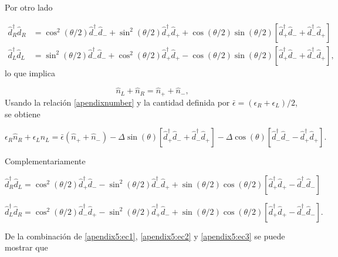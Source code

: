 \begin{appendixs}
Por otro lado

\begin{align*}
    \hat{d}^{\dagger}_{R}\hat{d}_{R} & = \cos^{2}(\theta/2) \hat{d}^{\dagger}_{-}\hat{d}_{-} + \sin^{2}(\theta/2) \hat{d}^{\dagger}_{+}\hat{d}_{+} + \cos(\theta/2)\sin(\theta/2)[\hat{d}^{\dagger}_{+}\hat{d}_{-} + \hat{d}^{\dagger}_{-}\hat{d}_{+} ] \\
    \hat{d}^{\dagger}_{L}\hat{d}_{L} & = \sin^{2}(\theta/2) \hat{d}^{\dagger}_{-}\hat{d}_{-} + \cos^{2}(\theta/2) \hat{d}^{\dagger}_{+}\hat{d}_{+} - \cos(\theta/2)\sin(\theta/2)[\hat{d}^{\dagger}_{+}\hat{d}_{-} + \hat{d}^{\dagger}_{-}\hat{d}_{+} ],
\end{align*}
lo que implica

\begin{equation}
    \hat{n}_{L} + \hat{n}_{R} = \hat{n}_{+} + \hat{n}_{-},
    \label{apendixnumber}
\end{equation}
Usando la relación \ref{apendixnumber} y la cantidad definida por $\bar{\epsilon} = (\epsilon_{R} + \epsilon_{L})/2$, se obtiene 

\begin{equation}
    \epsilon_{R} \hat{n}_{R} + \epsilon_{L} \hat{n}_{L}  = \bar{\epsilon}( \hat{n}_{+} + \hat{n}_{-} ) - \Delta \sin(\theta) [\hat{d}^{\dagger}_{+}\hat{d}_{-} + \hat{d}^{\dagger}_{-}\hat{d}_{+}] - \Delta \cos(\theta) [\hat{d}^{\dagger}_{-}\hat{d}_{-} - \hat{d}^{\dagger}_{+}\hat{d}_{+}].
\label{apendix5:ec1}
\end{equation}

Complementariamente

\begin{equation}
    \hat{d}^{\dagger}_{R}\hat{d}_{L} = \cos^{2}(\theta/2)\hat{d}^{\dagger}_{+}\hat{d}_{-} - \sin^{2}(\theta/2) \hat{d}^{\dagger}_{-}\hat{d}_{+}  + \sin(\theta/2)\cos(\theta/2)[ \hat{d}^{\dagger}_{+}\hat{d}_{+} - \hat{d}^{\dagger}_{-}\hat{d}_{-} ]
    \label{apendix5:ec2}
\end{equation}

\begin{equation}
    \hat{d}^{\dagger}_{L}\hat{d}_{R} = \cos^{2}(\theta/2)\hat{d}^{\dagger}_{-}\hat{d}_{+} - \sin^{2}(\theta/2) \hat{d}^{\dagger}_{+}\hat{d}_{-}  + \sin(\theta/2)\cos(\theta/2)[ \hat{d}^{\dagger}_{+}\hat{d}_{+} - \hat{d}^{\dagger}_{-}\hat{d}_{-} ].
    \label{apendix5:ec3}
\end{equation}

De la combinación de \ref{apendix5:ec1}, \ref{apendix5:ec2} y \ref{apendix5:ec3} se puede mostrar que 


\end{appendixs}
